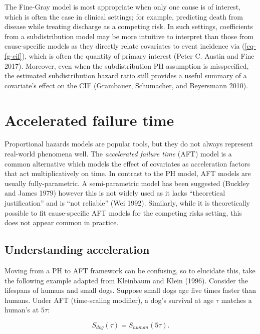 \documentclass[
  letterpaper,
  krantz2]{style/krantz}
\begin{document}
The Fine-Gray model is most appropriate when only one cause is of
interest, which is often the case in clinical settings; for example,
predicting death from disease while treating discharge as a competing
risk. In such settings, coefficients from a subdistribution model may be
more intuitive to interpret than those from cause-specific
models as they directly
relate covariates to event incidence via (\ref{eq-fg-cif}), which is
often the quantity of primary interest (Peter C. Austin and Fine 2017).
Moreover, even when the subdistribution PH assumption is misspecified,
the estimated subdistribution hazard ratio still provides a useful
summary of a covariate's effect on the CIF (Grambauer, Schumacher, and
Beyersmann 2010).

\section{Accelerated failure time}\label{sec-surv-models-param}

Proportional hazards models are popular tools, but they do not always
represent real-world phenomena well. The \emph{accelerated failure time}
(AFT) model is a common alternative which models the effect of
covariates as acceleration factors that act multiplicatively on time. In
contrast to the PH model, AFT models are usually fully-parametric.
 A semi-parametric model has been
suggested (Buckley and James 1979) however this is not widely used as it
lacks ``theoretical justification'' and is ``not reliable'' (Wei
1992).
Similarly, while it is theoretically possible to fit cause-specific AFT
models for the competing risks setting, this does not appear common in
practice.

\subsection{Understanding
acceleration}\label{understanding-acceleration}

Moving from a PH to AFT framework can be confusing, so to elucidate
this, take the following example adapted from Kleinbaum and Klein
(1996). Consider the lifespans of humans and small dogs. Suppose small
dogs age five times faster than humans.
 Under AFT (time-scaling
modifier), a dog's survival at age \(\tau\) matches a human's at
\(5\tau\):

\[
S_{dog}(\tau) = S_{human}(5\tau).
\]
\end{document}
